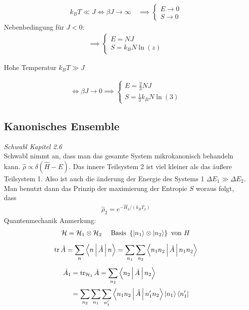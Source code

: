\documentclass[11pt]{article}
\theoremstyle{plain}
\theoremstyle{mytheoremstyle}
\newcommand{\trace}{\operatorname{tr}}
\begin{document}
\begin{description}
\begin{align*}
      k_B T \ll J \iff \beta J \longrightarrow \infty \quad \implies \begin{cases}
        E \longrightarrow 0 \\ S \longrightarrow 0
      \end{cases}
    \end{align*}
    Nebenbedingung f\"ur $J < 0$: 
    \begin{align*}
      \implies  \begin{cases}
        E = N J \\
        S = k_B N \ln{(z)}
      \end{cases}
    \end{align*}

    Hohe Temperatur $k_B T \gg J$

    \begin{align*}
      \iff \beta J \longrightarrow  0 \implies 
      \begin{cases}
        E = \frac{2}{3} N J \\
        S = \frac{1}{3} k_B N \ln{(3)}
      \end{cases}
    \end{align*}
\end{description}
\subsection*{Kanonisches Ensemble}
\emph{Schwabl Kapitel 2.6} \\
Schwabl nimmt an, dass man das gesamte System mikrokanonisch behandeln kann.
$\hat{\rho} \propto \delta (\hat{H} -E)$. Das innere Teilsystem 2 ist
viel kleiner als das \"au\ss{}ere Teilsystem 1. Also ist auch die \"anderung
der Energie des Systems 1 $\Delta E_1 \gg \Delta E_2$. Man benutzt dann
das Prinzip der maximierung der Entropie $S$ woraus folgt, dass
%
\begin{align*}
  \hat{\rho}_2 = e^{- \hat{H}_2 / (k_B T_2) }
\end{align*}
%
Quantenmechanik Anmerkung:
%
\begin{align*}
  \mathcal{H} = \mathcal{H}_1 \otimes \mathcal{ H}_2 && \text{ Basis } 
  \left\{ \Ket{n_1} \otimes \Ket{n_2} \right\} \text{ von } H
\end{align*}
%
\begin{align*}
  \trace \hat{A} = \sum_{n}^{} \Braket{n | \hat{ A} | n} = 
  \sum_{n_1}^{} \sum_{n_2}^{} \Braket{n_1 n_2 | \hat{A} | n_1 n_2} 
\end{align*}
%
%
\begin{align*}
  \hat{A}_1 & = \trace_{\mathcal{H}_1} \hat{A} = \sum_{n_2}^{} \Braket{n_2 | \hat{A} | n_2} \\
            & = \sum_{n_2}^{} \sum_{n_1}^{} \sum_{n_1'}^{} 
  \Braket{ n_1 n_2 | \hat{A} | n_1' n_2} \Ket{n_1} \Bra{n_1'}
\end{align*}
%
\end{document}

